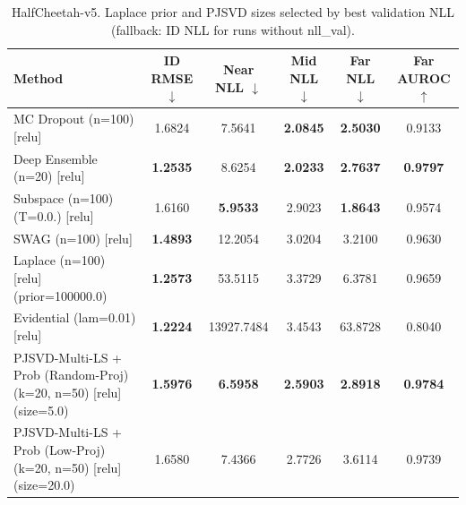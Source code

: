 \begin{table}[t]
\centering
\caption{HalfCheetah-v5. Laplace prior and PJSVD sizes selected by best validation NLL (fallback: ID NLL for runs without nll_val).}
\begin{tabular}{lccccc}
\toprule
Method & ID RMSE $\downarrow$ & Near NLL $\downarrow$ & Mid NLL $\downarrow$ & Far NLL $\downarrow$ & Far AUROC $\uparrow$ \\
\midrule
MC Dropout (n=100) [relu] & 1.6824 & 7.5641 & \textbf{2.0845} & \textbf{2.5030} & 0.9133 \\
Deep Ensemble (n=20) [relu] & \textbf{1.2535} & 8.6254 & \textbf{2.0233} & \textbf{2.7637} & \textbf{0.9797} \\
Subspace (n=100) (T=0.0.) [relu] & 1.6160 & \textbf{5.9533} & 2.9023 & \textbf{1.8643} & 0.9574 \\
SWAG (n=100) [relu] & \textbf{1.4893} & 12.2054 & 3.0204 & 3.2100 & 0.9630 \\
Laplace (n=100) [relu] (prior=100000.0) & \textbf{1.2573} & 53.5115 & 3.3729 & 6.3781 & 0.9659 \\
Evidential (lam=0.01) [relu] & \textbf{1.2224} & 13927.7484 & 3.4543 & 63.8728 & 0.8040 \\
PJSVD-Multi-LS + Prob (Random-Proj) (k=20, n=50) [relu] (size=5.0) & \textbf{1.5976} & \textbf{6.5958} & \textbf{2.5903} & \textbf{2.8918} & \textbf{0.9784} \\
PJSVD-Multi-LS + Prob (Low-Proj) (k=20, n=50) [relu] (size=20.0) & 1.6580 & 7.4366 & 2.7726 & 3.6114 & 0.9739 \\
\bottomrule
\end{tabular}
\end{table}

